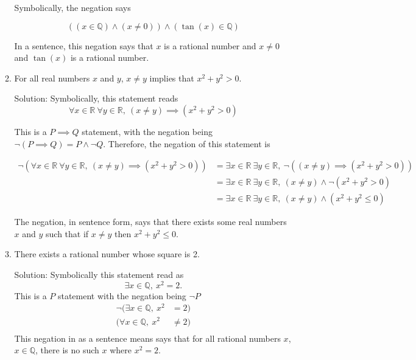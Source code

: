 \documentclass[11pt]{amsart}
\newcommand{\R}{\mathbb{R}}
\newcommand{\Q}{\mathbb{Q}}
\begin{document}
\begin{enumerate}
\begin{enumerate}
Symbolically, the negation says 

\[
    ((x \in \Q) \wedge (x \neq 0)) \wedge ( \tan(x) \in \Q)
\]

In a sentence, this negation says that $x$ is a rational number and $ x \neq 0 $ and $\tan(x)$ is a rational number. 


\item For all real numbers $x$ and $y$, $x\neq y$ implies that $x^2+y^2>0$.

Solution: Symbolically, this statement reads
\[ \forall x \in \R \ \forall y \in \R, \ (x \neq y) \implies (x^2 + y^2 > 0) \]

This is a $ P \implies Q$ statement, with the negation being $\neg (P \implies Q) = P \wedge \neg Q$. Therefore, the negation of this statement is

\begin{align*}
    \neg (\forall x \in \R \ \forall y \in \R, \ (x \neq y) \implies (x^2 + y^2 > 0)) &= \exists x \in \R \ \exists y \in \R, \ \neg ( (x \neq y) \implies (x^2 + y^2 > 0)) \\
    &= \exists x \in \R \ \exists y \in \R, \ (x \neq y) \wedge \neg(x^2 + y^2 > 0) \\
    &= \exists x \in \R \ \exists y \in \R, \ (x \neq y) \wedge (x^2 + y^2 \leq 0)
\end{align*}

The negation, in sentence form,  says that there exists some real numbers $x$ and $y$ such that if $x \neq y$ then $x^2 + y^2 \leq 0$.

\item There exists a rational number whose square is 2.

Solution: Symbolically this statement read as 
\[ 
\exists x \in \Q, \ x^2 = 2.
\]
This is a $P$ statement with the negation being $\neg P$
\begin{align*}
    \neg(\exists x \in \Q, \ x^2 &= 2)\\
    (\forall x \in \Q, \ x^2 & \neq 2)\\
\end{align*}
This negation in as a sentence means says that for all rational numbers $x$, $x \in \Q$,  there is no such $x$ where $x^2 = 2$.




\end{enumerate}
\end{enumerate}
\end{document}
